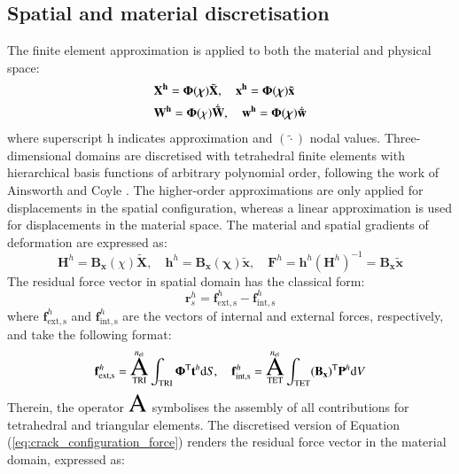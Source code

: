 \documentclass[11pt]{acmeArticle}
\DeclareMathOperator*{\aoperator}{ \text{\huge${\rm{A}}$}}
\numberwithin{equation}{section}
\begin{document}
\subsection{Spatial and material discretisation}
The finite element approximation is applied to both the material and physical space:
\begin{equation}
\begin{aligned}
& \mathbf{ X^h} = \mathbf \Phi({\boldsymbol {\rm {\chi}}}) \tilde {\mathbf{ X}}, \quad \mathbf{x^h} = \mathbf{\Phi}({\boldsymbol {\chi}}) {\tilde{\mathbf{x}}} \\
& \mathbf{ W^h} = \mathbf \Phi(\chi) {\dot { \tilde {\boldsymbol {\rm W} } }}, \quad \mathbf{w^h} = \mathbf{\Phi}({\boldsymbol {\chi}}){\dot { \tilde {\boldsymbol {\rm w} } }}
\end{aligned}
\end{equation}
where superscript h indicates approximation and $(\tilde \cdot)$ nodal values. Three-dimensional domains are discretised with tetrahedral finite elements with hierarchical basis functions of arbitrary polynomial order, following the work of Ainsworth and Coyle \citep{Ainsworth2003}. The higher-order approximations are only applied for displacements in the spatial configuration, whereas a linear approximation is used for displacements in the material space. The material and spatial gradients of deformation are expressed as:
\begin{equation}
\mathbf H^h = \mathbf{B_x}(\chi) {\tilde{\mathbf{X}}}, \quad \mathbf h^h = \mathbf{B_x} ({\boldsymbol {\chi}}) { \tilde{\mathbf{x}}}, \quad \mathbf F^h = \mathbf h^h (\mathbf H^h)^{-1} = \mathbf{B_x} \mathbf{\tilde x}
\end{equation}
The residual force vector in spatial domain has the classical form:
\begin{equation}
\mathbf r_s^h = \mathbf f_\mathrm{{ext,s}}^h - \mathbf f_\mathrm{{int,s}}^h
\end{equation}
where $\mathbf f_\mathrm{{ext,s}}^h $ and $  \mathbf f_\mathrm{{int,s}}^h$ are the vectors of internal and external forces, respectively, and take the following format:
\begin{equation}
\mathbf f_\mathrm{{ext,s}}^h = \aoperator_{\text{TRI}}^{n_{\rm {el}}} \int_\text{TRI} \mathbf \Phi^{\rm T} \mathbf t^h \mathrm d S, \quad \mathbf f_\mathrm{{int,s}}^h = \aoperator_{\text{TET}}^{n_{\rm {el}}} \int_\text{TET}  (\mathbf{ B_x})^{\rm T} \mathbf{P}^h \mathrm d V
\end{equation}
Therein, the operator $ \aoperator$ symbolises the assembly of all contributions for tetrahedral and triangular elements. The discretised version of Equation (\ref{eq:crack_configuration_force}) renders the residual force vector in the material domain, expressed as:
\end{document}
